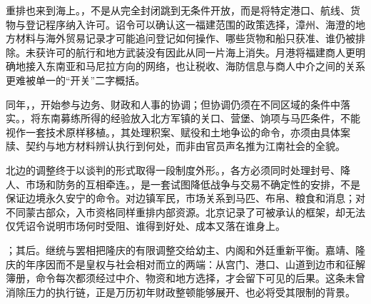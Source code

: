 重排也来到海上。，不是从完全封闭跳到无条件开放，而是将特定港口、航线、货物与登记程序纳入许可。诏令可以确认这一福建范围的政策选择，漳州、海澄的地方材料与海外贸易记录才可能追问登记如何操作、哪些货物和船只获准、谁仍被排除。未获许可的航行和地方武装没有因此从同一片海上消失。月港将福建商人更明确地接入东南亚和马尼拉方向的网络，也让税收、海防信息与商人中介之间的关系更难被单一的“开关”二字概括。

同年，，开始参与边务、财政和人事的协调；但协调仍须在不同区域的条件中落实。，将东南募练所得的经验放入北方军镇的关口、营堡、饷项与马匹条件，不能视作一套技术原样移植。，其处理积案、赋役和土地争讼的命令，亦须由具体案牍、契约与地方材料辨认执行到何处，而非由官员声名推为江南社会的全貌。

北边的调整终于以谈判的形式取得一段制度外形。，各方必须同时处理封号、降人、市场和防务的互相牵连。，是一套试图降低战争与交易不确定性的安排，不是保证边境永久安宁的命令。对边镇军民，市场关系到马匹、布帛、粮食和消息；对不同蒙古部众，入市资格同样重排内部资源。北京记录了可被承认的框架，却无法仅凭诏令说明市场何时受阻、谁得到好处、成本又落在谁身上。

；其后。继统与罢相把隆庆的有限调整交给幼主、内阁和外廷重新平衡。嘉靖、隆庆的年序因而不是皇权与社会相对而立的两端：从宫门、港口、山道到边市和征解簿册，命令每次都须经过中介、物资和地方选择，才会留下可见的后果。这条未曾消除压力的执行链，正是万历初年财政整顿能够展开、也必将受其限制的背景。
